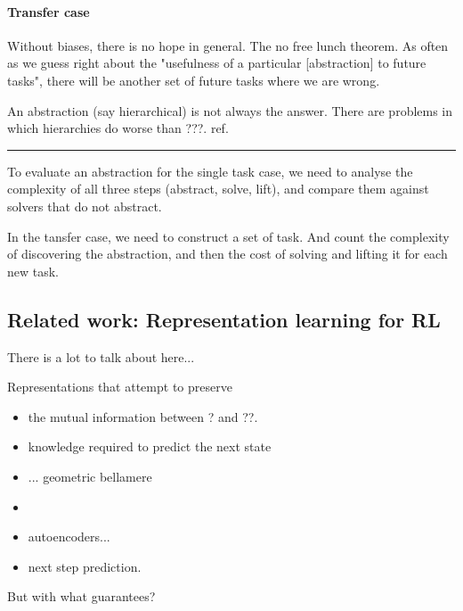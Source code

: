 \paragraph{Transfer case}

Without biases, there is no hope in general. The no free lunch theorem.
As often as we guess right about the "usefulness of a particular [abstraction] to future tasks",
there will be another set of future tasks where we are wrong.

An abstraction (say hierarchical) is not always the answer. There are problems in which
hierarchies do worse than ???. ref.

\begin{center}\rule{0.5\linewidth}{\linethickness}\end{center}

To evaluate an abstraction for the single task case, we need to analyse the
complexity of all three steps (abstract, solve, lift), and compare them against
solvers that do not abstract.

In the tansfer case, we need to construct a set of task. And count the
complexity of discovering the abstraction, and then the cost of solving
and lifting it for each new task.

\subsection{Related work: Representation learning for RL}


{\color{red}There is a lot to talk about here...}

Representations that attempt to preserve
\begin{itemize}
\tightlist
  \item the mutual information between ? and ??.
  \item knowledge required to predict the next state
  \item ... geometric bellamere
  \item \cite{Nachum2018}
  \item autoencoders...
  \item next step prediction.
\end{itemize}

But with what guarantees?
